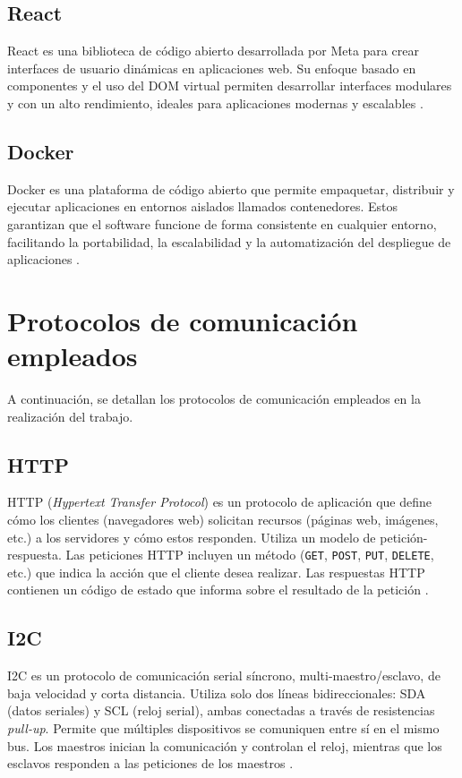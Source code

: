 \subsection{React}
React es una biblioteca de código abierto desarrollada por Meta para crear interfaces de usuario dinámicas en aplicaciones web. Su enfoque basado en componentes y el uso del DOM virtual permiten desarrollar interfaces modulares y con un alto rendimiento, ideales para aplicaciones modernas y escalables \cite{reactnative}.

\subsection{Docker}
Docker es una plataforma de código abierto que permite empaquetar, distribuir y ejecutar aplicaciones en entornos aislados llamados contenedores. Estos garantizan que el software funcione de forma consistente en cualquier entorno, facilitando la portabilidad, la escalabilidad y la automatización del despliegue de aplicaciones \cite{docker}.

\section{Protocolos de comunicación empleados}

A continuación, se detallan los protocolos de comunicación empleados en la realización del trabajo.

\subsection{HTTP}
HTTP (\textit{Hypertext Transfer Protocol}) es un protocolo de aplicación que define cómo los clientes (navegadores web) solicitan recursos (páginas web, imágenes, etc.) a los servidores y cómo estos responden. Utiliza un modelo de petición-respuesta. Las peticiones HTTP incluyen un método (\texttt{GET}, \texttt{POST}, \texttt{PUT}, \texttt{DELETE}, etc.) que indica la acción que el cliente desea realizar. Las respuestas HTTP contienen un código de estado que informa sobre el resultado de la petición \cite{HTTP}.

\subsection{I2C}
I2C es un protocolo de comunicación serial síncrono, multi-maestro/esclavo, de baja velocidad y corta distancia. Utiliza solo dos líneas bidireccionales: SDA (datos seriales) y SCL (reloj serial), ambas conectadas a través de resistencias \textit{pull-up}. Permite que múltiples dispositivos se comuniquen entre sí en el mismo bus. Los maestros inician la comunicación y controlan el reloj, mientras que los esclavos responden a las peticiones de los maestros \cite{I2C}.


